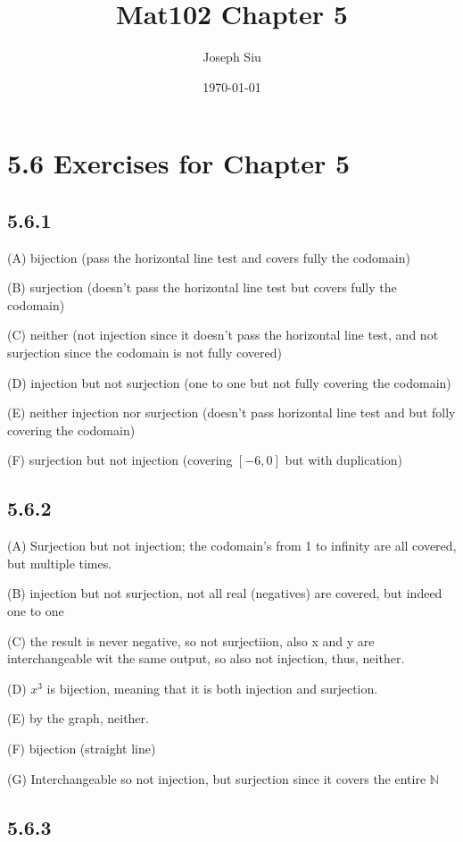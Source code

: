 \documentclass{article}
\title{Mat102 Chapter 5}
\author{Joseph Siu}
\date{\today}
\begin{document}
\maketitle

\section*{5.6 Exercises for Chapter 5}

\subsection*{5.6.1}

(A) bijection (pass the horizontal line test and covers fully the codomain)

(B) surjection (doesn't pass the horizontal line test but covers fully the codomain)

(C) neither (not injection since it doesn't pass the horizontal line test, and not surjection since the codomain is not fully covered)

(D) injection but not surjection (one to one but not fully covering the codomain)

(E) neither injection nor surjection (doesn't pass horizontal line test and but folly covering the codomain)

(F) surjection but not injection (covering $[-6,0]$ but with duplication) 

\subsection*{5.6.2}

(A) Surjection but not injection; the codomain's from 1 to infinity are all covered, but multiple times.

(B) injection but not surjection, not all real (negatives) are covered, but indeed one to one

(C) the result is never negative, so not surjectiion, also x and y are interchangeable wit the same output, so also not injection, thus, neither. 

(D) $x^3$ is bijection, meaning that it is both injection and surjection.

(E) by the graph, neither.

(F) bijection (straight line)

(G) Interchangeable so not injection, but surjection since it covers the entire $\mathbb{N}$

\subsection*{5.6.3}
\end{document}
